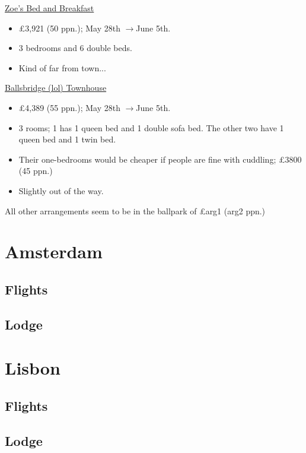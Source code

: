 \documentclass[12pt]{article}
\renewcommand{\to}{$\rightarrow$}
\newcommand{\cost}[2]{\pounds#1 (#2 ppn.)}
\begin{document}
	\href{https://www.airbnb.co.uk/rooms/7305892?adults=10&children=0&infants=0&check_in=2022-05-28&check_out=2022-06-05&federated_search_id=7416d1fc-62a0-4764-a1fa-8f70ded658be&source_impression_id=p3_1648312760_KodxjaW24K6A1UKj}{Zoe's Bed and Breakfast}
	\begin{itemize}
		\item \cost{3,921}{50}; May 28th \to June 5th.
		\item 3 bedrooms and 6 double beds.
		\item Kind of far from town...
	\end{itemize}
	\href{https://www.booking.com/hotel/ie/merrion-road-ballsbridge.html?aid=355028;sid=3f62ec944d118827daff72c411262409;all_sr_blocks=188261006_92403605_0_0_0%2C188261002_348859887_0_0_0%2C188261002_348859887_0_0_0;checkin=2022-05-28;checkout=2022-06-05;dest_id=-1502554;dest_type=city;dist=0;group_adults=10;group_children=0;hapos=4;highlighted_blocks=188261006_92403605_0_0_0%2C188261002_348859887_0_0_0%2C188261002_348859887_0_0_0;hpos=4;matching_block_id=188261006_92403605_0_0_0;no_rooms=1;req_adults=10;req_children=0;room1=A%2CA%2CA%2CA%2CA%2CA%2CA%2CA%2CA%2CA;sb_price_type=total;sr_order=popularity;sr_pri_blocks=188261006_92403605_0_0_0__204900%2C188261002_348859887_0_0_0__161117%2C188261002_348859887_0_0_0__161117;srepoch=1648312598;srpvid=4f9e74ca2749018e;type=total;ucfs=1&#hotelTmpl}{Ballsbridge (lol) Townhouse}
	\begin{itemize}
		\item \cost{4,389}{55}; May 28th \to June 5th.
		\item 3 rooms; 1 has 1 queen bed and 1 double sofa bed. The other two have 1 queen bed and 1 twin bed.
		\item Their one-bedrooms would be cheaper if people are fine with cuddling; \cost{3800}{45}
		\item Slightly out of the way.
	\end{itemize}
	All other arrangements seem to be in the ballpark of \cost{arg1}{arg2}

	\section{Amsterdam}
	
	\subsection{Flights}
	
	\subsection{Lodge}
	
	\section{Lisbon}
	
	\subsection{Flights}
	
	\subsection{Lodge}
\end{document}

